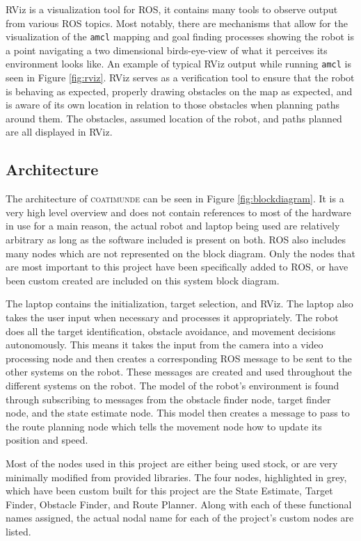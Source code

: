 \documentclass{article}[12]
\begin{document}
	RViz is a visualization tool for ROS, it contains many tools to observe output from various ROS topics. Most notably, there are mechanisms that allow for the visualization of the \texttt{amcl} mapping and goal finding processes showing the robot is a point navigating a two dimensional birds-eye-view of what it perceives its environment looks like. An example of typical RViz output while running \texttt{amcl} is seen in Figure \ref{fig:rviz}. RViz serves as a verification tool to ensure that the robot is behaving as expected, properly drawing obstacles on the map as expected, and is aware of its own location in relation to those obstacles when planning paths around them. The obstacles, assumed location of the robot, and paths planned are all displayed in RViz.

	\subsection{Architecture}
	
	The architecture of \textsc{coatimunde} can be seen in Figure \ref{fig:blockdiagram}. It is a very high level overview and does not contain references to most of the hardware in use for a main reason, the actual robot and laptop being used are relatively arbitrary as long as the software included is present on both. ROS also includes many nodes which are not represented on the block diagram. Only the nodes that are most important to this project have been specifically added to ROS, or have been custom created are included on this system block diagram.
	
	The laptop contains the initialization, target selection, and RViz. The laptop also takes the user input when necessary and processes it appropriately.  The robot does all the target identification, obstacle avoidance, and movement decisions autonomously. This means it takes the input from the camera into a video processing node and then creates a corresponding ROS message to be sent to the other systems on the robot. These messages are created and used throughout the different systems on the robot. The model of the robot's environment is found through subscribing to messages from the obstacle finder node, target finder node, and the state estimate node. This model then creates a message to pass to the route planning node which tells the movement node how to update its position and speed. 
	
	Most of the nodes used in this project are either being used stock, or are very minimally modified from provided libraries. The four nodes, highlighted in grey, which have been custom built for this project are the State Estimate, Target Finder, Obstacle Finder, and Route Planner. Along with each of these functional names assigned, the actual nodal name for each of the project's custom nodes are listed.
\end{document}

